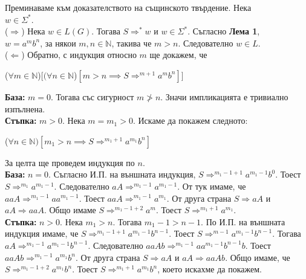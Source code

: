 \documentclass[openany]{book}
\begin{document}
        Преминаваме към доказателството на същинското твърдение. Нека \\ $w \in \Sigma^*$. \\
        ($\Rightarrow$) Нека $w \in L(G)$. Тогава $S \Rightarrow^* w$ и $w \in \Sigma^*$. 
        Съгласно \textbf{Лема 1}, \\ $w = a^mb^n$, за някои $m,n \in \mathbb{N}$, такива че 
        $m > n$. Следователно $w \in L$. \\
        ($\Leftarrow$) Обратно, с индукция относно $m$ ще докажем, че \\
        \begin{center}
            ($\forall m \in \mathbb{N}$)$[(\forall n \in \mathbb{N}$)$[m > n \implies S \Rightarrow^{m+1} a^mb^n]]$
        \end{center}
        \textbf{База:} $m = 0$. Тогава със сигурност $m \not > n$. Значи импликацията
        е тривиално изпълнена. \\
        \vspace{5pt}
        \textbf{Стъпка:} $m > 0$. Нека $m = m_1 > 0$. Искаме да покажем следното: \\
        \begin{center}
            ($\forall n \in \mathbb{N})[m_1 > n \implies S \Rightarrow^{{m_1}+1} a^{m_1}b^n]$
        \end{center}
        За целта ще проведем индукция по $n$. \\
        \vspace{5pt}
        \hspace{15pt} \textbf{База:} $n=0$. Съгласно И.П. на външната индукция, 
        $S \Rightarrow^{m_1-1+1} a^{m_1-1}b^0$. Тоест $S \Rightarrow^{m_1} a^{m_1-1}$. Следователно
        $aA \Rightarrow^{m_1-1} a^{m_1-1}$. От тук имаме, че $aaA \Rightarrow^{m_1-1} aa^{m_1-1}$.
        Тоест $aaA \Rightarrow^{m_1-1} a^{m_1}$. От друга страна $S \Rightarrow aA$ и $aA \Rightarrow aaA$.
        Общо имаме $S \Rightarrow^{m_1-1+2} a^m$. Тоест $S \Rightarrow^{m_1+1} a^{m_1}$. \\
        \hspace{15pt} \textbf{Стъпка:} $n > 0$. Нека $m_1 > n$. Тогава $m_1-1 > n-1$. 
        По И.П. на външната индукция имаме, че $S \Rightarrow^{m_1-1+1}a^{m_1-1}b^{n-1}$.
        Тоест $S \Rightarrow^{m-1}a^{m_1-1}b^{n-1}$. Тогава $aA \Rightarrow^{m_1-1} a^{m_1-1}b^{n-1}$. 
        Следователно $aaAb \Rightarrow^{m_1-1} aa^{m_1-1}b^{n-1}b$. Тоест 
        $aaAb \Rightarrow^{m_1-1}a^{m_1}b^n$. От друга страна $S \Rightarrow aA$ и 
        $aA \Rightarrow aaAb$. Общо имаме, че $S \Rightarrow^{m_1-1+2} a^{m_1}b^n$. 
        Тоест $S \Rightarrow^{m_1+1} a^{m_1}b^n$, което искахме да покажем.
\end{document}

